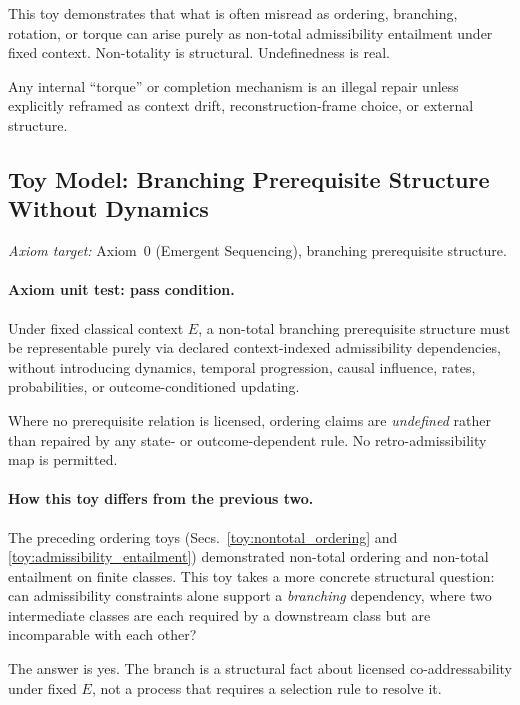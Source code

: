 \documentclass[aps,prx,onecolumn,11pt]{revtex4-2}
\theoremstyle{plain}
\theoremstyle{definition}
\theoremstyle{remark}
\begin{document}
This toy demonstrates that what is often misread as ordering,
branching, rotation, or torque can arise purely as non-total
admissibility entailment under fixed context. Non-totality is
structural. Undefinedness is real.

Any internal ``torque'' or completion mechanism is an illegal repair
unless explicitly reframed as context drift, reconstruction-frame
choice, or external structure.

\subsection{Toy Model: Branching Prerequisite Structure Without Dynamics}
\label{toy:structural_nontotal_ordering}

\noindent\emph{Axiom target:} Axiom~0 (Emergent Sequencing), branching prerequisite structure.

\paragraph{Axiom unit test: pass condition.}

Under fixed classical context \(E\), a non-total branching prerequisite
structure must be representable purely via declared context-indexed
admissibility dependencies, without introducing dynamics, temporal
progression, causal influence, rates, probabilities, or
outcome-conditioned updating.

Where no prerequisite relation is licensed, ordering claims are
\emph{undefined} rather than repaired by any state- or
outcome-dependent rule. No retro-admissibility map is permitted.

\paragraph{How this toy differs from the previous two.}

The preceding ordering toys
(Secs.~\ref{toy:nontotal_ordering} and
\ref{toy:admissibility_entailment}) demonstrated non-total ordering and
non-total entailment on finite classes. This toy takes a more concrete
structural question: can admissibility constraints alone support a
\emph{branching} dependency, where two intermediate classes are each
required by a downstream class but are incomparable with each other?

The answer is yes. The branch is a structural fact about licensed
co-addressability under fixed \(E\), not a process that requires a
selection rule to resolve it.
\end{document}

